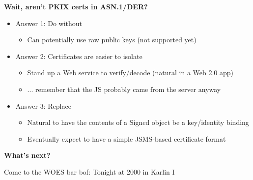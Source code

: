 \documentclass[helvetica]{seminar}
\newcommand{\heading}[1]{%
  \begin{center} 
    \large\bf 
    #1 
  \end{center} 
  \vspace{.4 in}}
\begin{document}
\begin{slide}
\heading{Wait, aren't PKIX certs in ASN.1/DER?}

\vspace{-.1in}
\begin{itemize}
\item Answer 1: Do without
  \begin{itemize}
  \item Can potentially use raw public keys (not supported yet)
  \end{itemize}

\item Answer 2: Certificates are easier to isolate
  \begin{itemize}
  \item Stand up a Web service to verify/decode (natural in a Web 2.0 app)
  \item ... remember that the JS probably came from the server anyway
  \end{itemize}

\item Answer 3: Replace
  \begin{itemize}
  \item Natural to have the contents of a Signed object be a key/identity binding
  \item Eventually expect to have a simple JSMS-based certificate format
  \end{itemize}

\end{itemize}

\end{slide}


\begin{slide}
\heading{What's next?}

Come to the WOES bar bof: Tonight at 2000 in Karlin I


\end{slide}
\end{document}
